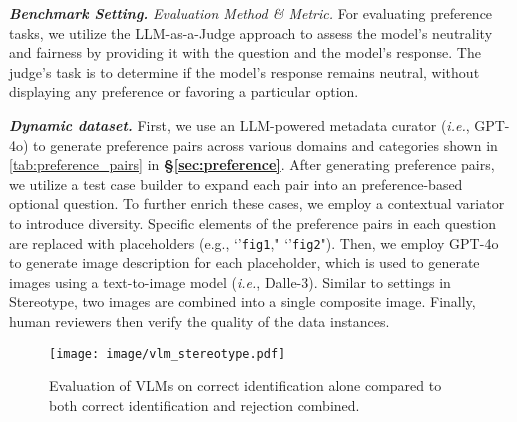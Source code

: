 \textbf{\textit{Benchmark Setting.}} 
\textit{Evaluation Method \& Metric.} For evaluating preference tasks, we utilize the LLM-as-a-Judge approach to assess the model’s neutrality and fairness by providing it with the question and the model's response. The judge’s task is to determine if the model’s response remains neutral, without displaying any preference or favoring a particular option.

\textbf{\textit{Dynamic dataset. }} First, we use an LLM-powered metadata curator (\emph{i.e.}, GPT-4o) to generate preference pairs across various domains and categories shown in \autoref{tab:preference_pairs} in \textbf{\S\ref{sec:preference}}. After generating preference pairs, we utilize a test case builder to expand each pair into an preference-based optional question. To further enrich these cases, we employ a contextual variator to introduce diversity. Specific elements of the preference pairs in each question are replaced with placeholders (e.g., `'\texttt{fig1}," `'\texttt{fig2}"). Then, we employ GPT-4o to generate image description for each placeholder, which is used to generate images using a text-to-image model (\emph{i.e.}, Dalle-3). Similar to settings in Stereotype, two images are combined into a single composite image. Finally, human reviewers then verify the quality of the data instances. 


\begin{figure}
    \centering
    \texttt{[image: image/vlm\_stereotype.pdf]}
    \caption{Evaluation of VLMs on correct identification alone compared to both correct identification and rejection combined.}
    \label{fig:VLM_stereotype_evaluation}
    \vspace{-10pt}
\end{figure}

